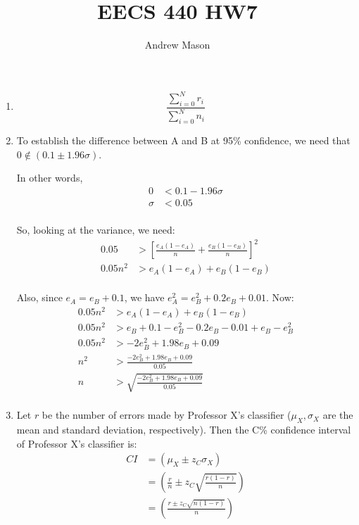 \documentclass[12pt]{article}
\title{EECS 440 HW7}
\author{Andrew Mason}
\begin{document}
\maketitle

\begin{enumerate}
  \item
    $$\frac{\sum_{i=0}^{N}r_i}{\sum_{i=0}^{N}n_i}$$
  \item
    To establish the difference between A and B at 95\% confidence, we need
    that $0\notin\left(0.1\pm1.96\sigma\right)$.

    In other words,
    \begin{equation}
      \begin{split}
        0&<0.1-1.96\sigma\\
        \sigma&<0.05\\
      \end{split}
    \end{equation}

    So, looking at the variance, we need:
    \begin{equation}
      \begin{split}
        0.05&>\left[\frac{e_A\left(1-e_A\right)}{n}+\frac{e_B\left(1-e_B\right)}{n}\right]^2\\
        0.05n^2&>e_A\left(1-e_A\right)+e_B\left(1-e_B\right)\\
      \end{split}
    \end{equation}

    Also, since $e_A=e_B+0.1$, we have $e_A^2=e_B^2+0.2e_B+0.01$. Now:
    \begin{equation}
      \begin{split}
        0.05n^2&>e_A\left(1-e_A\right)+e_B\left(1-e_B\right)\\
        0.05n^2&>e_B+0.1-e_B^2-0.2e_B-0.01+e_B-e_B^2\\
        0.05n^2&>-2e_B^2+1.98e_B+0.09\\
        n^2&>\frac{-2e_B^2+1.98e_B+0.09}{0.05}\\
        n&>\sqrt{\frac{-2e_B^2+1.98e_B+0.09}{0.05}}\\
      \end{split}
    \end{equation}
  \item
    Let $r$ be the number of errors made by Professor X's classifier
    ($\mu_X, \sigma_X$ are the mean and standard deviation, respectively). Then
    the C\% confidence interval of Professor X's classifier is:
    \begin{equation}
      \begin{split}
        CI&=\left(\mu_X\pm z_C\sigma_X\right)\\
        &=\left(\frac{r}{n}\pm z_C\sqrt{\frac{r\left(1-r\right)}{n}}\right)\\
        &=\left(\frac{r\pm z_C\sqrt{n\left(1-r\right)}}{n}\right)\\
      \end{split}
    \end{equation}


\end{enumerate}
\end{document}
